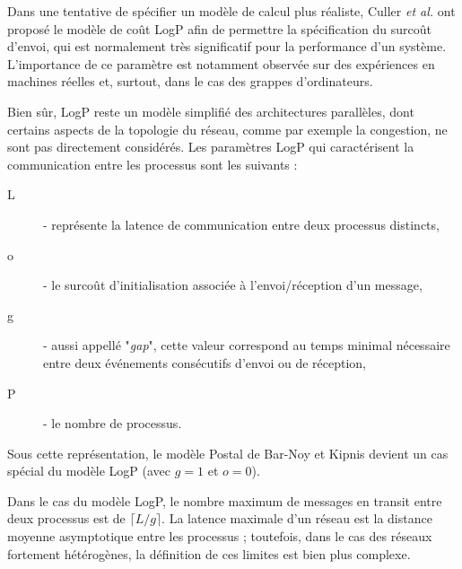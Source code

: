 %
Dans une tentative de spécifier un modèle de calcul plus réaliste,
Culler \emph{et al.} \cite{Culler96} ont proposé le modèle de coût
LogP afin de permettre la spécification du surcoût d'envoi, qui
est normalement très significatif pour la performance d'un système.
L'importance de ce paramètre est notamment observée sur des expériences
en machines réelles et, surtout, dans le cas des grappes d'ordinateurs. 


Bien sûr, LogP reste un modèle simplifié des architectures parallèles,
dont certains aspects de la topologie du réseau, comme par exemple
la congestion, ne sont pas directement considérés. Les paramètres LogP qui caractérisent
la communication entre les processus sont les suivants : 

\begin{description}
\item [{L}] - représente la latence de communication entre deux processus
distincts,
\item [{o}] - le surcoût d'initialisation associée à l'envoi/réception
d'un message,
\item [{g}] - aussi appellé "\textit{gap}", cette valeur correspond au temps minimal nécessaire entre deux événements consécutifs
d'envoi ou de réception,
\item [{P}] - le nombre de processus.
\end{description}
Sous cette représentation, le modèle Postal de Bar-Noy et Kipnis devient
un cas spécial du modèle LogP (avec $g=1$ et $o=0$). 

Dans le cas du modèle LogP, le nombre maximum de messages en transit
entre deux processus est de $\lceil L/g\rceil$. La latence maximale
d'un réseau est la distance moyenne asymptotique entre les processus
; toutefois, dans le cas des réseaux fortement hétérogènes, la définition
de ces limites est bien plus complexe. 

